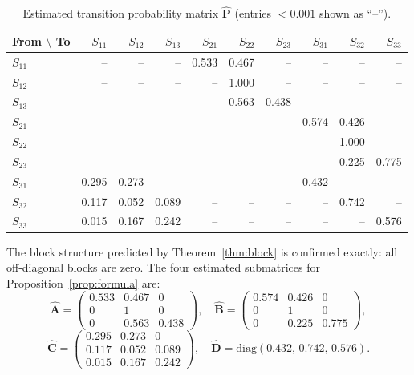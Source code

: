 \documentclass[12pt,a4paper]{article}
\newcommand{\mat}[1]{\mathbf{#1}}
\begin{document}
\begin{table}[ht]
\centering
\caption{Estimated transition probability matrix $\hat{\mat{P}}$
         (entries $< 0.001$ shown as ``--'').}
\label{tab:transition-matrix}
\setlength{\tabcolsep}{5pt}
\begin{tabular}{l rrr rrr rrr}
\toprule
\textbf{From $\setminus$ To} &
  $S_{11}$ & $S_{12}$ & $S_{13}$ &
  $S_{21}$ & $S_{22}$ & $S_{23}$ &
  $S_{31}$ & $S_{32}$ & $S_{33}$ \\
\midrule
$S_{11}$ &-- &-- &-- & 0.533 & 0.467 &-- &-- &-- &-- \\
$S_{12}$ &-- &-- &-- &-- & 1.000 &-- &-- &-- &-- \\
$S_{13}$ &-- &-- &-- &-- & 0.563 & 0.438 &-- &-- &-- \\
$S_{21}$ &-- &-- &-- &-- &-- &-- & 0.574 & 0.426 &-- \\
$S_{22}$ &-- &-- &-- &-- &-- &-- &-- & 1.000 &-- \\
$S_{23}$ &-- &-- &-- &-- &-- &-- &-- & 0.225 & 0.775 \\
$S_{31}$ & 0.295 & 0.273 &-- &-- &-- &-- & 0.432 &-- &-- \\
$S_{32}$ & 0.117 & 0.052 & 0.089 &-- &-- &-- &-- & 0.742 &-- \\
$S_{33}$ & 0.015 & 0.167 & 0.242 &-- &-- &-- &-- &-- & 0.576 \\
\bottomrule
\end{tabular}
\end{table}

The block structure predicted by Theorem~\ref{thm:block} is confirmed exactly:
all off-diagonal blocks are zero.
The four estimated submatrices for Proposition~\ref{prop:formula} are:
\[
  \hat{\mat{A}} =
  \begin{pmatrix}0.533 & 0.467 & 0 \\ 0 & 1 & 0 \\ 0 & 0.563 & 0.438\end{pmatrix},\quad
  \hat{\mat{B}} =
  \begin{pmatrix}0.574 & 0.426 & 0 \\ 0 & 1 & 0 \\ 0 & 0.225 & 0.775\end{pmatrix},
\]
\[
  \hat{\mat{C}} =
  \begin{pmatrix}0.295 & 0.273 & 0 \\ 0.117 & 0.052 & 0.089 \\ 0.015 & 0.167 & 0.242\end{pmatrix},\quad
  \hat{\mat{D}} = \mathrm{diag}(0.432,\, 0.742,\, 0.576).
\]
\end{document}
